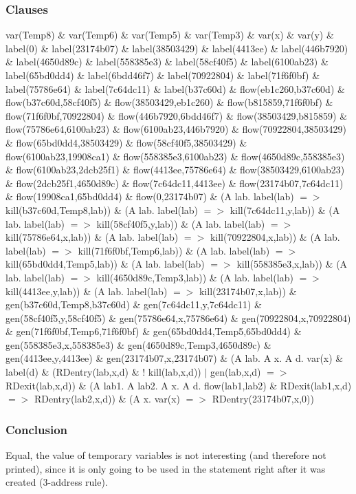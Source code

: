 \subsubsection{Clauses}
var(Temp8) \& var(Temp6) \& var(Temp5) \& var(Temp3) \& var(x) \& var(y) \& 
label(0) \& label(23174b07) \& label(38503429) \& label(4413ee) \& label(446b7920) \& label(4650d89c) \& label(558385e3) \& label(58cf40f5) \& label(6100ab23) \& label(65bd0dd4) \& label(6bdd46f7) \& label(70922804) \& label(71f6f0bf) \& label(75786e64) \& label(7c64dc11) \& label(b37c60d) \& 
flow(eb1c260,b37c60d) \& flow(b37c60d,58cf40f5) \& flow(38503429,eb1c260) \& flow(b815859,71f6f0bf) \& flow(71f6f0bf,70922804) \& flow(446b7920,6bdd46f7) \& flow(38503429,b815859) \& flow(75786e64,6100ab23) \& flow(6100ab23,446b7920) \& flow(70922804,38503429) \& flow(65bd0dd4,38503429) \& flow(58cf40f5,38503429) \& flow(6100ab23,19908ca1) \& flow(558385e3,6100ab23) \& flow(4650d89c,558385e3) \& flow(6100ab23,2dcb25f1) \& flow(4413ee,75786e64) \& flow(38503429,6100ab23) \& flow(2dcb25f1,4650d89c) \& flow(7c64dc11,4413ee) \& flow(23174b07,7c64dc11) \& flow(19908ca1,65bd0dd4) \& flow(0,23174b07) \& 
(A lab. label(lab) $=>$ kill(b37c60d,Temp8,lab)) \& (A lab. label(lab) $=>$ kill(7c64dc11,y,lab)) \& (A lab. label(lab) $=>$ kill(58cf40f5,y,lab)) \& (A lab. label(lab) $=>$ kill(75786e64,x,lab)) \& (A lab. label(lab) $=>$ kill(70922804,x,lab)) \& (A lab. label(lab) $=>$ kill(71f6f0bf,Temp6,lab)) \& (A lab. label(lab) $=>$ kill(65bd0dd4,Temp5,lab)) \& (A lab. label(lab) $=>$ kill(558385e3,x,lab)) \& (A lab. label(lab) $=>$ kill(4650d89c,Temp3,lab)) \& (A lab. label(lab) $=>$ kill(4413ee,y,lab)) \& (A lab. label(lab) $=>$ kill(23174b07,x,lab)) \& 
gen(b37c60d,Temp8,b37c60d) \& gen(7c64dc11,y,7c64dc11) \& gen(58cf40f5,y,58cf40f5) \& gen(75786e64,x,75786e64) \& gen(70922804,x,70922804) \& gen(71f6f0bf,Temp6,71f6f0bf) \& gen(65bd0dd4,Temp5,65bd0dd4) \& gen(558385e3,x,558385e3) \& gen(4650d89c,Temp3,4650d89c) \& gen(4413ee,y,4413ee) \& gen(23174b07,x,23174b07) \& 
(A lab. A x. A d. var(x) \& label(d) \& (RDentry(lab,x,d) \& ! kill(lab,x,d)) $|$ gen(lab,x,d) $=>$ RDexit(lab,x,d)) \& 
(A lab1. A lab2. A x. A d. flow(lab1,lab2) \& RDexit(lab1,x,d) $=>$ RDentry(lab2,x,d)) \& 
(A x. var(x) $=>$ RDentry(23174b07,x,0))
\subsubsection{Conclusion}
Equal, the value of temporary variables is not interesting (and therefore not printed), since it is only going to be used in the statement right after it was created (3-address rule).

